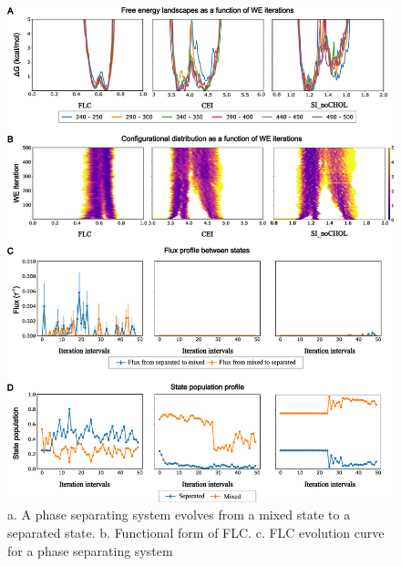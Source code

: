 \documentclass{biophys-new}
\begin{document}
\begin{figure}[hbt!]
\centering
\includegraphics[width=0.92\linewidth]{Figures/Main/4/placeholder1.jpg}
\caption{a. A phase separating system evolves from a mixed state to a separated state. b. Functional form of FLC. c. FLC evolution curve for a phase separating system}
\label{figs4:view}
\end{figure}
\end{document}
